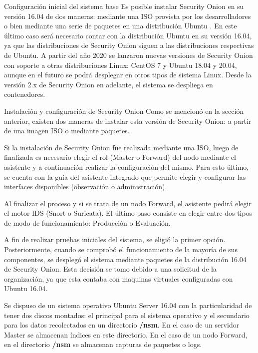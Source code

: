     \begin{section}{Configuración inicial del sistema base}
        Es posible instalar Security Onion en su versión 16.04 de dos maneras: mediante una ISO provista por los desarrolladores o bien mediante una serie de paquetes en una distribución Ubuntu \cite{ubuntu}. En este último caso será necesario contar con la distribución Ubuntu en su versión 16.04, ya que las distribuciones de Security Onion siguen a las distribuciones respectivas de Ubuntu. A partir del año 2020 se lanzaron nuevas versiones de Security Onion con soporte a otras distribuciones Linux: CentOS 7 y Ubuntu 18.04 y 20.04, aunque en el futuro se podrá desplegar en otros tipos de sistema Linux. Desde la versión 2.x de Security Onion en adelante, el sistema se despliega en contenedores.

        \begin{subsection}{Instalación y configuración de Security Onion}
        Como se mencionó en la sección anterior, existen dos maneras de instalar esta versión de Security Onion: a partir de una imagen ISO o mediante paquetes. \par 
        Si la instalación de Security Onion fue realizada mediante una ISO, luego de finalizada es necesario elegir el rol (Master o Forward) del nodo mediante el asistente y a continuación realizar la configuración del mismo. Para esto último, se cuenta con la guía del asistente integrado que permite elegir y configurar las interfaces disponibles (observación o administración). \par
        Al finalizar el proceso y si se trata de un nodo Forward, el asistente pedirá elegir el motor IDS (Snort o Suricata). El último paso consiste en elegir entre dos tipos de modo de funcionamiento: Producción o Evaluación.\par
       
        A fin de realizar pruebas iniciales del sistema, se eligió la primer opción. Posteriormente, cuando se comprobó el funcionamiento de la mayoría de sus componentes, se desplegó el sistema mediante paquetes de la distribución 16.04 de Security Onion. Esta decisión se tomo debido a una solicitud de la organización, ya que esta contaba con maquinas virtuales configuradas con Ubuntu 16.04. \par
        
        Se dispuso de un sistema operativo Ubuntu Server 16.04 con la particularidad de tener dos discos montados: el principal para el sistema operativo y el secundario para los datos recolectados en un directorio \textbf{/nsm}. En el caso de un servidor Master se almacenan índices en este directorio. En el caso de un nodo Forward, en el directorio \textbf{/nsm} se almacenan capturas de paquetes o logs. \par 
        

\end{subsection}
\end{section}
